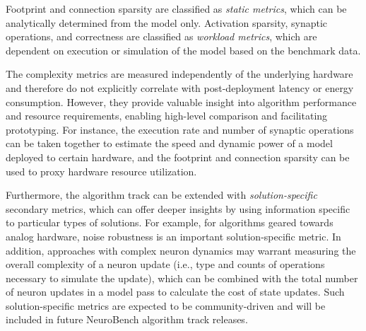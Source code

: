     Footprint and connection sparsity are classified as \textit{static metrics}, which can be analytically determined from the model only. Activation sparsity, synaptic operations, and correctness are classified as \textit{workload metrics}, which are dependent on execution or simulation of the model based on the benchmark data.


    
    The complexity metrics are measured independently of the underlying hardware and therefore do not explicitly correlate with post-deployment latency or energy consumption. However, they provide valuable insight into algorithm performance and resource requirements, enabling high-level comparison and facilitating prototyping. For instance, the execution rate and number of synaptic operations can be taken together to estimate the speed and dynamic power of a model deployed to certain hardware, and the footprint and connection sparsity can be used to proxy hardware resource utilization. %

    Furthermore, the algorithm track can be extended with \textit{solution-specific} secondary metrics, which can offer deeper insights by using information specific to particular types of solutions. For example, for algorithms geared towards analog hardware, noise robustness is an important solution-specific metric. In addition, approaches with complex neuron dynamics may warrant measuring the overall complexity of a neuron update (i.e., type and counts of operations necessary to simulate the update), which can be combined with the total number of neuron updates in a model pass to calculate the cost of state updates. Such solution-specific metrics are expected to be community-driven and will be included in future NeuroBench algorithm track releases.


